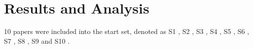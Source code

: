 \documentclass{article}
\begin{document}
\section{Results and Analysis}\label{ResultsAndAnalysis}
10 papers were included into the start set, denoted as S1 \cite{barmi2011alignmentS1}, S2 \cite{kukkanen2009applyingS2}, S3 \cite{sabaliauskaite2010challengesS3}, S4 \cite{post2009linkingS4}, S5 \cite{uusitalo2008linkingS5}, S6 \cite{graham2002requirementsS6}, S7 \cite{larsson2014revisitingS7}, S8 \cite{wnuk2014delicateS8}, S9 \cite{bjarnason2014challengesS9} and S10 \cite{unterkalmsteiner2014taxonomyS10}. 
\end{document}
